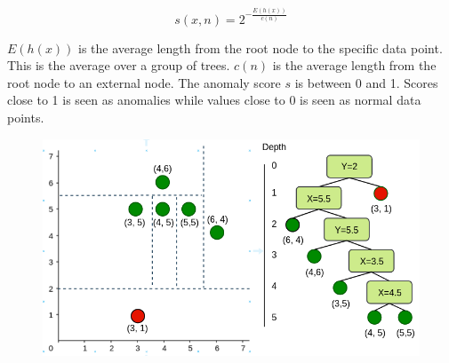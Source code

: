 \begin{equation}
  s(x,n) = 2^{-\frac{E(h(x))}{c(n)}}
\end{equation}

$E(h(x))$ is the average length from the root node to the specific data point. This is the average over a group of trees. $c(n)$ is the average length from the root node to an external node. The anomaly score $s$ is between 0 and 1.   
Scores close to 1 is seen as anomalies while values close to 0 is seen as normal data points. 
\begin{figure}
  \centering
  \includegraphics[width=\linewidth]{images/rich_sketch_original.png}
  \caption{}
  \label{fig:rich_sketch_original}
\end{figure}